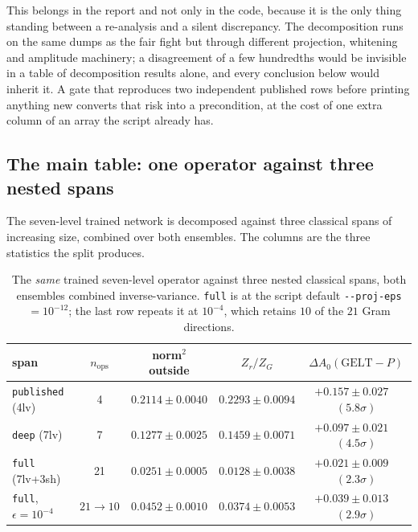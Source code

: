 \documentclass[11pt,a4paper]{article}
\newcommand{\dAzero}{\Delta A_0}
\newcommand{\arm}[1]{\texttt{#1}}
\begin{document}
This belongs in the report and not only in the code, because it is the only
thing standing between a re-analysis and a silent discrepancy. The decomposition
runs on the same dumps as the fair fight but through different projection,
whitening and amplitude machinery; a disagreement of a few hundredths would be
invisible in a table of decomposition results alone, and every conclusion below
would inherit it. A gate that reproduces two independent published rows before
printing anything new converts that risk into a precondition, at the cost of one
extra column of an array the script already has.

\subsection{The main table: one operator against three nested spans}
\label{sec:spans}

The seven-level trained network is decomposed against three classical spans of
increasing size, combined over both ensembles. The columns are the three
statistics the split produces.

\begin{table}[htbp]
\centering\small
\caption{The \emph{same} trained seven-level operator against three nested
classical spans, both ensembles combined inverse-variance. \arm{full} is at the
script default \texttt{-{}-proj-eps} $=10^{-12}$; the last row repeats it at
$10^{-4}$, which retains $10$ of the $21$ Gram directions.}
\label{tab:spans}
\begin{tabular}{@{}lcccc@{}}
\toprule
span & $n_{\text{ops}}$ & norm${}^2$ outside & $Z_r/Z_G$
     & $\dAzero(\text{GELT} - P)$ \\
\midrule
\arm{published} (4lv)   & 4  & $0.2114 \pm 0.0040$ & $0.2293 \pm 0.0094$ & $+0.157 \pm 0.027$ \ $(5.8\sigma)$ \\
\arm{deep} (7lv)        & 7  & $0.1277 \pm 0.0025$ & $0.1459 \pm 0.0071$ & $+0.097 \pm 0.021$ \ $(4.5\sigma)$ \\
\arm{full} (7lv+3sh)    & 21 & $0.0251 \pm 0.0005$ & $0.0128 \pm 0.0038$ & $+0.021 \pm 0.009$ \ $(2.3\sigma)$ \\
\addlinespace
\arm{full}, $\epsilon = 10^{-4}$ & $21\!\to\!10$ & $0.0452 \pm 0.0010$ & $0.0374 \pm 0.0053$ & $+0.039 \pm 0.013$ \ $(2.9\sigma)$ \\
\bottomrule
\end{tabular}
\end{table}
\end{document}
